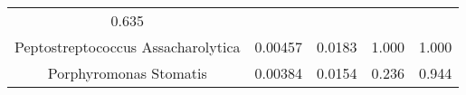 \documentclass[12pt,]{article}
\begin{document}
\begin{longtable}[]{@{}ccccc@{}}
\begin{minipage}[t]{0.21\columnwidth}
0.635\strut
\end{minipage}\tabularnewline
\begin{minipage}[t]{0.24\columnwidth}\centering\strut
Peptostreptococcus Assacharolytica\strut
\end{minipage} & \begin{minipage}[t]{0.10\columnwidth}\centering\strut
0.00457\strut
\end{minipage} & \begin{minipage}[t]{0.18\columnwidth}\centering\strut
0.0183\strut
\end{minipage} & \begin{minipage}[t]{0.13\columnwidth}\centering\strut
1.000\strut
\end{minipage} & \begin{minipage}[t]{0.21\columnwidth}\centering\strut
1.000\strut
\end{minipage}\tabularnewline
\begin{minipage}[t]{0.24\columnwidth}\centering\strut
Porphyromonas Stomatis\strut
\end{minipage} & \begin{minipage}[t]{0.10\columnwidth}\centering\strut
0.00384\strut
\end{minipage} & \begin{minipage}[t]{0.18\columnwidth}\centering\strut
0.0154\strut
\end{minipage} & \begin{minipage}[t]{0.13\columnwidth}\centering\strut
0.236\strut
\end{minipage} & \begin{minipage}[t]{0.21\columnwidth}\centering\strut
0.944\strut
\end{minipage}\tabularnewline
\bottomrule
\end{longtable}
\end{document}
